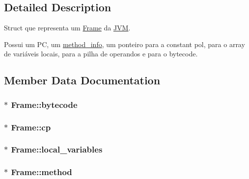 \subsection{Detailed Description}
Struct que representa um \hyperlink{structFrame}{Frame} da \hyperlink{structJVM}{J\+VM}. 

Possui um PC, um \hyperlink{structmethod__info}{method\+\_\+info}, um ponteiro para a constant pol, para o array de variáveis locais, para a pilha de operandos e para o bytecode. 

\subsection{Member Data Documentation}
\subsubsection[{\texorpdfstring{bytecode}{bytecode}}]{$\ast$ Frame\+::bytecode}\hypertarget{structFrame_ad3bdd8cc30352e62af5898b699d54c16}{}\label{structFrame_ad3bdd8cc30352e62af5898b699d54c16}
\subsubsection[{\texorpdfstring{cp}{cp}}]{$\ast$ Frame\+::cp}\hypertarget{structFrame_ada1bd832b6f72f87a35d88c68b9a188a}{}\label{structFrame_ada1bd832b6f72f87a35d88c68b9a188a}
\subsubsection[{\texorpdfstring{local\+\_\+variables}{local_variables}}]{$\ast$ Frame\+::local\+\_\+variables}\hypertarget{structFrame_a1a3968ae645e9c154229a2631639ebd5}{}\label{structFrame_a1a3968ae645e9c154229a2631639ebd5}
\subsubsection[{\texorpdfstring{method}{method}}]{$\ast$ Frame\+::method}\hypertarget{structFrame_af0943cac72b53aa5aa67f3e7097430a1}{}\label{structFrame_af0943cac72b53aa5aa67f3e7097430a1}
